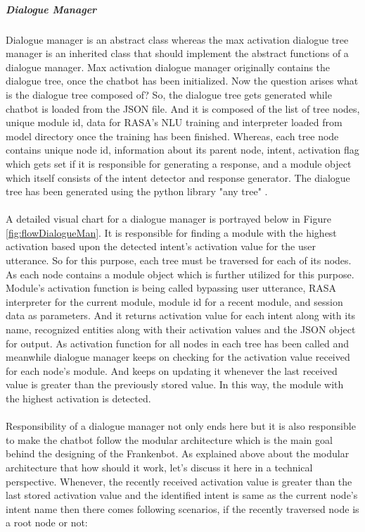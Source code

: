 \subparagraph*{Dialogue Manager} Dialogue manager is an abstract class whereas the max activation dialogue tree manager is an inherited class that should implement the abstract functions of a dialogue manager. Max activation dialogue manager originally contains the dialogue tree, once the chatbot has been initialized. Now the question arises what is the dialogue tree composed of? So, the dialogue tree gets generated while chatbot is loaded from the JSON file. And it is composed of the list of tree nodes, unique module id, data for RASA's NLU training and interpreter loaded from model directory once the training has been finished. Whereas, each tree node contains unique node id, information about its parent node,  intent, activation flag which gets set if it is responsible for generating a response, and a module object which itself consists of the intent detector and response generator. The dialogue tree has been generated using the python library "any tree" \cite{anytree}.
\\~\\
A detailed visual chart for a dialogue manager is portrayed below in Figure \ref{fig:flowDialogueMan}. It is responsible for finding a module with the highest activation based upon the detected intent's activation value for the user utterance. So for this purpose, each tree must be traversed for each of its nodes. As each node contains a module object which is further utilized for this purpose. Module's activation function is being called bypassing user utterance, RASA interpreter for the current module, module id for a recent module, and session data as parameters. And it returns activation value for each intent along with its name, recognized entities along with their activation values and the JSON object for output. As activation function for all nodes in each tree has been called and meanwhile dialogue manager keeps on checking for the activation value received for each node's module. And keeps on updating it whenever the last received value is greater than the previously stored value. In this way, the module with the highest activation is detected.
\\~\\
Responsibility of a dialogue manager not only ends here but it is also responsible to make the chatbot follow the modular architecture which is the main goal behind the designing of the Frankenbot. As explained above about the modular architecture that how should it work, let's discuss it here in a technical perspective. Whenever, the recently received activation value is greater than the last stored activation value and the identified intent is same as the current node's intent name then there comes following scenarios, if the recently traversed node is a root node or not: 
